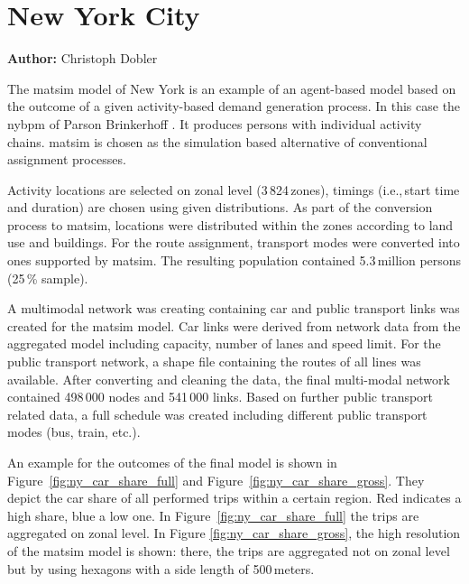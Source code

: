\section{New York City}
\label{sec:nyc}
\hfill \textbf{Author:} Christoph Dobler

The \gls{matsim} model of New York is an example of an agent-based model based on the outcome of a given activity-based demand generation process. In this case the \gls{nybpm} of Parson Brinkerhoff \citep[][]{VovshaEtAl_TRR_2002, ParsonsBrinckerhoff_ResRep_NYBPM_2005, ParsonsBrinckerhoff_ResRep_NYBPM_2009}. It produces persons with individual activity chains. \gls{matsim} is chosen as the simulation based alternative of conventional assignment processes.

Activity locations are selected on zonal level (3\,824\,zones), timings (i.e.,\,start time and duration) are chosen using given distributions. As part of the conversion process to \gls{matsim}, locations were distributed within the zones according to land use and buildings. For the route assignment, transport modes were converted into ones supported by \gls{matsim}. The resulting population contained 5.3\,million persons (25\,\% sample).

A \gls{multimodal} network was creating containing car and public transport links was created for the \gls{matsim} model. Car links were derived from network data from the aggregated model including capacity, number of lanes and speed limit. For the public transport network, a shape file containing the routes of all lines was available. After converting and cleaning the data, the final multi-modal network contained 498\,000 nodes and 541\,000 links. Based on further public transport related data, a full schedule was created including different public transport modes (bus, train, etc.).

An example for the outcomes of the final model is shown in Figure~\ref{fig:ny_car_share_full} and Figure~\ref{fig:ny_car_share_gross}. They depict the car share of all performed trips within a certain region. Red indicates a high share, blue a low one. In Figure~\ref{fig:ny_car_share_full} the trips are aggregated on zonal level. In Figure \ref{fig:ny_car_share_gross}, the high resolution of the \gls{matsim} model is shown: there, the trips are aggregated not on zonal level but by using hexagons with a side length of 500\,meters.

